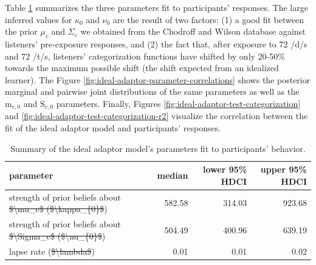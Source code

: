 \documentclass[
  11pt,
  man,mask,floatsintext]{apa6}
\makeatletter
\providecommand{\DIFadd}[1]{{\protect\color{blue}\uwave{#1}}} %
\providecommand{\DIFdel}[1]{{\protect\color{red}\sout{#1}}} %
\providecommand{\DIFaddFL}[1]{\DIFadd{#1}} %
\providecommand{\DIFdelFL}[1]{\DIFdel{#1}} %
\providecommand{\DIFaddbeginFL}{} %
\providecommand{\DIFaddendFL}{} %
\providecommand{\DIFdelbeginFL}{} %
\providecommand{\DIFdelendFL}{} %
\newcommand{\DIFscaledelfig}{0.5}
\newlength{\DIFdelgraphicswidth} %
\newlength{\DIFdelgraphicsheight} %
\newcommand{\DIFaddincludegraphics}[2][]{{\color{blue}\fbox{\DIFOincludegraphics[#1]{#2}}}} %
\newcommand{\DIFdelincludegraphics}[2][]{%
\sbox{\DIFdelgraphicsbox}{\DIFOincludegraphics[#1]{#2}}%
\settoboxwidth{\DIFdelgraphicswidth}{\DIFdelgraphicsbox} %
\settoboxtotalheight{\DIFdelgraphicsheight}{\DIFdelgraphicsbox} %
\scalebox{\DIFscaledelfig}{%
\parbox[b]{\DIFdelgraphicswidth}{\usebox{\DIFdelgraphicsbox}\\[-\baselineskip] \rule{\DIFdelgraphicswidth}{0em}}\llap{\resizebox{\DIFdelgraphicswidth}{\DIFdelgraphicsheight}{%
\setlength{\unitlength}{\DIFdelgraphicswidth}%
\begin{picture}(1,1)%
\thicklines\linethickness{2pt} %
{\color[rgb]{1,0,0}\put(0,0){\framebox(1,1){}}}%
{\color[rgb]{1,0,0}\put(0,0){\line( 1,1){1}}}%
{\color[rgb]{1,0,0}\put(0,1){\line(1,-1){1}}}%
\end{picture}%
}\hspace*{3pt}}} %
} %
\DeclareRobustCommand{\DIFaddbeginFL}{\DIFOaddbeginFL \let\includegraphics\DIFaddincludegraphics} %
\DeclareRobustCommand{\DIFaddendFL}{\DIFOaddendFL \let\includegraphics\DIFOincludegraphics} %
\DeclareRobustCommand{\DIFdelbeginFL}{\DIFOdelbeginFL \let\includegraphics\DIFdelincludegraphics} %
\DeclareRobustCommand{\DIFdelendFL}{\DIFOaddendFL \let\includegraphics\DIFOincludegraphics} %
\let\sout@orig\sout %
\renewcommand{\sout}[1]{\ifmmode\text{\sout@orig{\ensuremath{#1}}}\else\sout@orig{#1}\fi} %
\makeatother
\begin{document}
Table \ref{tab:ideal-adaptor-parameter-summary} summarizes the three parameters fit to participants' responses. The large inferred values for \(\kappa_{0}\) and \(\nu_{0}\) are the result of two factors: (1) a good fit between the prior \(\mu_{c}\) and \(\Sigma_c\) we obtained from the Chodroff and Wilson database against listeners' pre-exposure responses, and (2) the fact that, after exposure to 72 /d/s and 72 /t/s, listeners' categorization functions have shifted by only 20-50\% towards the maximum possible shift (the shift expected from an idealized learner). The Figure \ref{fig:ideal-adaptor-parameter-correlations} shows the posterior marginal and pairwise joint distributions of the same parameters as well as the \(\mathrm{m}_{c,0}\) and \(\mathrm{S}_{c,0}\) parameters. Finally, Figures \ref{fig:ideal-adaptor-test-categorization} and \ref{fig:ideal-adaptor-test-categorization-r2} visualize the correlation between the fit of the ideal adaptor model and participants' responses.

\begin{table}

\caption{\label{tab:ideal-adaptor-parameter-summary}Summary of the ideal adaptor model's parameters fit to participants' behavior.}
\centering
\begin{tabular}[t]{l|r|r|r}
\hline
parameter & median & lower 95\% HDCI & upper 95\% HDCI\\
\hline
strength of prior beliefs about \DIFdelbeginFL \DIFdelFL{\$\textbackslash{}mu\_c\$ (\$\textbackslash{}kappa\_\{0\}\$}\DIFdelendFL \DIFaddbeginFL \DIFaddFL{$\mu_c$ ($\kappa_{0}$}\DIFaddendFL ) & 582.58 & 314.03 & 923.68\\
\hline
strength of prior beliefs about \DIFdelbeginFL \DIFdelFL{\$\textbackslash{}Sigma\_c\$ (\$\textbackslash{}nu\_\{0\}\$}\DIFdelendFL \DIFaddbeginFL \DIFaddFL{$\Sigma_c$ ($\nu_{0}$}\DIFaddendFL ) & 504.49 & 400.96 & 639.19\\
\hline
lapse rate (\DIFdelbeginFL \DIFdelFL{\$\textbackslash{}lambda\$}\DIFdelendFL \DIFaddbeginFL \DIFaddFL{$\lambda$}\DIFaddendFL ) & 0.01 & 0.01 & 0.02\\
\hline
\end{tabular}
\end{table}
\end{document}
